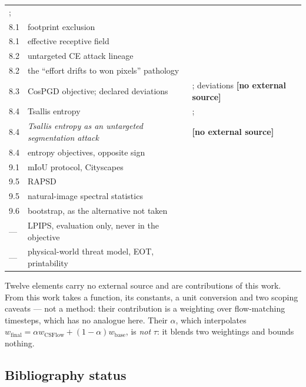 \documentclass[11pt,a4paper]{article}
\newcommand{\novel}{\textbf{[no external source]}}
\begin{document}
\begin{center}
\begin{longtable}{@{}lL{6.6cm}L{5.0cm}@{}}
      \citet{kingma2015adam}; \citet{loshchilov2017sgdr} \\
8.1 & footprint exclusion & \citet{mirsky2023ipatch} \\
8.1 & effective receptive field & \citet{luo2016erf} \\
8.2 & untargeted CE attack lineage &
      \citet{goodfellow2015fgsm,madry2018pgd,xie2017dag} \\
8.2 & the ``effort drifts to won pixels'' pathology & \citet{gu2022segpgd} \\
8.3 & CosPGD objective; declared deviations &
      \citet{agnihotri2024cospgd}; deviations \novel{} \\
8.4 & Tsallis entropy & \citet{tsallis1988}; \citet{havrda1967} \\
8.4 & \emph{Tsallis entropy as an untargeted segmentation attack} & \novel{} \\
8.4 & entropy objectives, opposite sign &
      \citet{grandvalet2004,wang2021tent} \\
9.1 & mIoU protocol, Cityscapes & \citet{cordts2016cityscapes} \\
9.5 & RAPSD & \citet{ruzanski2011rapsd} \\
9.5 & natural-image spectral statistics &
      \citet{field1987,falck2025fourier,dieleman2024spectral} \\
9.6 & bootstrap, as the alternative not taken & \citet{efron1993bootstrap} \\
--- & LPIPS, evaluation only, never in the objective & \citet{zhang2018lpips} \\
--- & physical-world threat model, EOT, printability &
      \citet{athalye2018eot,sharif2016nps} \\
\bottomrule
\end{longtable}
\end{center}

\noindent
Twelve elements carry no external source and are contributions of this work.
From \citet{galinska2026csflow} this work takes a function, its constants, a
unit conversion and two scoping caveats --- not a method: their contribution
is a weighting over flow-matching timesteps, which has no analogue here.
Their $\alpha$, which interpolates
$w_{\mathrm{final}}=\alpha w_{\mathrm{CSFlow}}+(1-\alpha)w_{\mathrm{base}}$,
is \emph{not} $\tau$: it blends two weightings and bounds nothing.

\subsection{Bibliography status}
\end{document}
